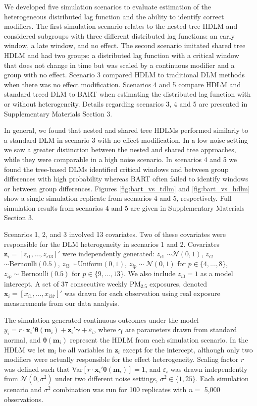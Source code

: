 \documentclass[12pt]{article}
\begin{document}
We developed five simulation scenarios to evaluate estimation of the heterogeneous distributed lag function and the ability to identify correct modifiers. The first simulation scenario relates to the nested tree HDLM and considered subgroups with three different distributed lag functions: an early window, a late window, and no effect. The second scenario imitated shared tree HDLM and had two groups: a distributed lag function with a critical window that does not change in time but was scaled by a continuous modifier and a group with no effect. Scenario 3 compared HDLM to traditional DLM methods when there was no effect modification. Scenarios 4 and 5 compare HDLM and standard treed DLM to BART when estimating the distributed lag function with or without heterogeneity. Details regarding scenarios 3, 4 and 5 are presented in Supplementary Materials Section 3.

In general, we found that nested and shared tree HDLMs performed similarly to a standard DLM in scenario 3 with no effect modification. In a low noise setting we saw a greater distinction between the nested and shared tree approaches, while they were comparable in a high noise scenario. In scenarios 4 and 5 we found the tree-based DLMs identified critical windows and between group differences with high probability whereas BART often failed to identify windows or between group differences. Figures \ref{fig:bart_vs_tdlm} and \ref{fig:bart_vs_hdlm} show a single simulation replicate from scenarios 4 and 5, respectively. Full simulation results from scenarios 4 and 5 are given in Supplementary Materials Section 3.




Scenarios 1, 2, and 3 involved 13 covariates. Two of these covariates were responsible for the DLM heterogeneity in scenarios 1 and 2. Covariates $\mathbf{z}_i=[z_{i1},\ldots,z_{i13}]'$ were independently generated: $z_{i1}$ $\sim\mathcal{N}(0,1)$, $z_{i2}$ $\sim\text{Bernoulli}(0.5)$, $z_{i3}$ $\sim\text{Uniform}(0,1)$, $z_{ip}\sim\mathcal{N}(0,1)$ for $p\in\{4,\ldots,8\}$, $z_{ip}\sim\text{Bernoulli}(0.5)$ for $p\in\{9,\ldots,13\}$. We also include $z_{i0}=1$ as a model intercept. A set of 37 consecutive weekly PM$_{2.5}$ exposures, denoted $\mathbf{x}_i=[x_{i1},\ldots,x_{i37}]'$ was drawn for each observation using real exposure measurements from our data analysis.

The simulation generated continuous outcomes under the model $y_i= r\cdot\mathbf{x}_i'\boldsymbol\theta(\mathbf{m}_i)+\mathbf{z}_i'\boldsymbol{\gamma}+\varepsilon_i$,
where $\boldsymbol{\gamma}$ are parameters drawn from standard normal, and $\boldsymbol\theta(\mathbf{m}_i)$ represent the HDLM from each simulation scenario. In the HDLM we let $\mathbf{m}_i$ be all variables in $\mathbf{z}_i$ except for the intercept, although only two modifiers were actually responsible for the effect heterogeneity. Scaling factor $r$ was defined such that Var$[r\cdot \mathbf{x}_i'\boldsymbol\theta(\mathbf{m}_i)]=1$, and $\varepsilon_i$ was drawn independently from $\mathcal{N}(0,\sigma^2)$ under two different noise settings, $\sigma^2\in\{1,25\}$. Each simulation scenario and $\sigma^2$ combination was run for 100 replicates with $n=$ 5,000 observations.
\end{document}
